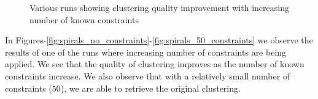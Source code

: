 \begin{figure}[p]
{\label{fig:spirals_cv_fold3}
}
\label{fig:spirals_cv}
\caption{Various runs showing clustering quality improvement with increasing number of known constraints}
\end{figure}

In Figures-\ref{fig:spirals_no_constraints}-\ref{fig:spirals_50_constraints} we observe the results of one of the runs where increasing number of constraints are being applied. 
We see that the quality of clustering improves as the number of known constraints increase. We also observe that with a relatively small number of 
constraints ($50$), we are able to retrieve the original clustering.  

